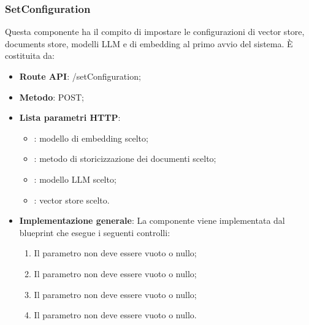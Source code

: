 \documentclass[10pt, a4paper]{article}
\begin{document}
\subsubsection{SetConfiguration}
Questa componente ha il compito di impostare le configurazioni di vector store, documents store, modelli LLM e di embedding al primo avvio del sistema.
È costituita da:
\begin{itemize}
    \item \textbf{Route API}: /setConfiguration;
    \item \textbf{Metodo}: POST;
    \item \textbf{Lista parametri HTTP}: 
    \begin{itemize}
        \item {}: modello di embedding scelto;
        \item {}: metodo di storicizzazione dei documenti scelto;
        \item {}: modello LLM scelto;
        \item {}: vector store scelto.
    \end{itemize}
    \item \textbf{Implementazione generale}: La componente viene implementata dal blueprint  che esegue i seguenti controlli:
        \begin{enumerate}
            \item Il parametro  non deve essere vuoto o nullo;
            \item Il parametro  non deve essere vuoto o nullo;
            \item Il parametro  non deve essere vuoto o nullo;
            \item Il parametro  non deve essere vuoto o nullo.
        \end{enumerate}
\end{itemize}
\end{document}

